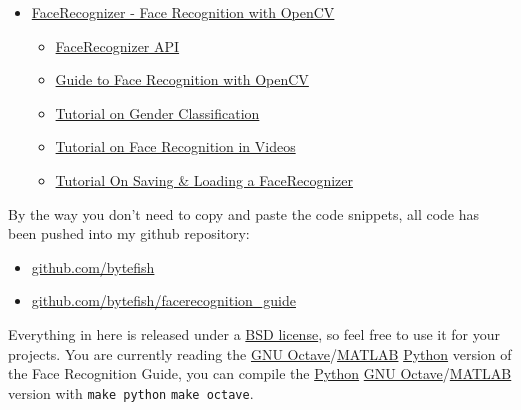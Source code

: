 \begin{itemize}
  \item \href{http://docs.opencv.org/trunk/modules/contrib/doc/facerec/index.html}{FaceRecognizer - Face Recognition with OpenCV}
  \begin{itemize}
    \item \href{http://docs.opencv.org/trunk/modules/contrib/doc/facerec/facerec_api.html}{FaceRecognizer API}
    \item \href{http://docs.opencv.org/trunk/modules/contrib/doc/facerec/facerec_tutorial.html}{Guide to Face Recognition with OpenCV}
    \item \href{http://docs.opencv.org/trunk/modules/contrib/doc/facerec/tutorial/facerec_gender_classification.html}{Tutorial on Gender Classification}
    \item \href{http://docs.opencv.org/trunk/modules/contrib/doc/facerec/tutorial/facerec_video_recognition.html}{Tutorial on Face Recognition in Videos}
    \item \href{http://docs.opencv.org/trunk/modules/contrib/doc/facerec/tutorial/facerec_save_load.html}{Tutorial On Saving \& Loading a FaceRecognizer}
  \end{itemize}
\end{itemize}

By the way you don't need to copy and paste the code snippets, all code has been pushed into my github repository:

\begin{itemize}
  \item \href{http://www.github.com/bytefish}{github.com/bytefish}
  \item \href{http://www.github.com/bytefish/facerecognition_guide}{github.com/bytefish/facerecognition\_guide}
\end{itemize}

Everything in here is released under a \href{http://www.opensource.org/licenses/bsd-license}{BSD license}, so feel free to use it for your projects. You are currently reading the \ifx\python\undefined \href{http://www.gnu.org/software/octave/}{GNU Octave}/\href{http://www.mathworks.com}{MATLAB} \else \href{http://www.python.org}{Python}\fi{} version of the Face Recognition Guide, you can compile the \ifx\python\undefined \href{http://www.python.org}{Python} \else \href{http://www.gnu.org/software/octave/}{GNU Octave}/\href{http://www.mathworks.com}{MATLAB}\fi{} version with \ifx\python\undefined \lstinline|make python| \else \lstinline|make octave|\fi{}.
